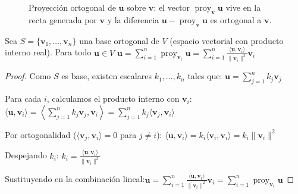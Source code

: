 \begin{figure}[!htbp]
\centering
{}
\caption{Proyección ortogonal de $\mathbf{u}$ sobre $\mathbf{v}$: el vector $\operatorname{proy}_{\mathbf{v}}\mathbf{u}$ vive en la recta generada por $\mathbf{v}$ y la diferencia $\mathbf{u}-\operatorname{proy}_{\mathbf{v}}\mathbf{u}$ es ortogonal a $\mathbf{v}$.}
\label{fig:proyeccion_ortogonal}
\end{figure}

\begin{theorem}
Sea $S = \{ \mathbf{v}_1, \dots, \mathbf{v}_n \}$ una base ortogonal de $V$ (espacio vectorial con producto interno real). Para todo $\mathbf{u} \in V$ \(
\mathbf{u} = \sum_{i=1}^n \operatorname{proy}_{\mathbf{v}_i} \mathbf{u} = \sum_{i=1}^n \frac{\langle \mathbf{u}, \mathbf{v}_i \rangle}{\|\mathbf{v}_i\|^2} \mathbf{v}_i
\)
\begin{proof}
Como $S$ es base, existen escalares $k_1, \dots, k_n$ tales que: \(
\mathbf{u} = \sum_{j=1}^n k_j \mathbf{v}_j
\)

Para cada $i$, calculamos el producto interno con $\mathbf{v}_i$: \(
\langle \mathbf{u}, \mathbf{v}_i \rangle = \left\langle \sum_{j=1}^n k_j \mathbf{v}_j, \mathbf{v}_i \right\rangle = \sum_{j=1}^n k_j \langle \mathbf{v}_j, \mathbf{v}_i \rangle
\)

Por ortogonalidad ($\langle \mathbf{v}_j, \mathbf{v}_i \rangle = 0$ para $j \neq i$): \(
\langle \mathbf{u}, \mathbf{v}_i \rangle = k_i \langle \mathbf{v}_i, \mathbf{v}_i \rangle = k_i \|\mathbf{v}_i\|^2
\)


Despejando $k_i$: \(
k_i = \frac{\langle \mathbf{u}, \mathbf{v}_i \rangle}{\|\mathbf{v}_i\|^2}
\)


Sustituyendo en la combinación lineal:\(
\mathbf{u} = \sum_{i=1}^n \frac{\langle \mathbf{u}, \mathbf{v}_i \rangle}{\|\mathbf{v}_i\|^2} \mathbf{v}_i = \sum_{i=1}^n \operatorname{proy}_{\mathbf{v}_i} \mathbf{u}
\)
\end{proof}
\end{theorem}

